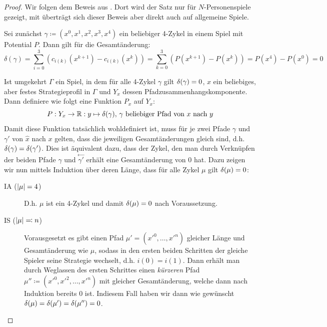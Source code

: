 \begin{proof}
	Wir folgen dem Beweis aus \cite[Anhang A]{MonShap}. Dort wird der Satz nur für $N$-Personenspiele gezeigt, mit  überträgt sich dieser Beweis aber direkt auch auf allgemeine Spiele.
	
	Sei zunächst $\gamma \coloneqq (x^0, x^1, x^2, x^3, x^4)$ ein beliebiger 4-Zykel in einem Spiel mit Potential $P$. Dann gilt für die Gesamtänderung:
		\[\delta(\gamma) = \sum_{i=0}^3 \left(c_{i(k)}(x^{k+1}) - c_{i(k)}(x^k)\right) = \sum_{k=0}^{3} \left(P(x^{k+1}) - P(x^k)\right) = P(x^4) - P(x^0) = 0^{}\]
		
	Ist umgekehrt $\Gamma$ ein Spiel, in dem für alle 4-Zykel $\gamma$ gilt $\delta(\gamma) = 0$, $x$ ein beliebiges, aber festes Strategieprofil in $\Gamma$ und $Y_x$ dessen Pfadzusammenhangskomponente. Dann definiere wie folgt eine Funktion $P_x$ auf $Y_x$:
		\[P: Y_x \to \mathbb{R}: y \mapsto \delta(\gamma), \,\gamma \text{ beliebiger Pfad von } x \text{ nach } y \]
	Damit diese Funktion tatsächlich wohldefiniert ist, muss für je zwei Pfade $\gamma$ und $\gamma'$ von $\hat{x}$ nach $x$ gelten, dass die jeweiligen Gesamtänderungen gleich sind, d.h. $\delta(\gamma) = \delta(\gamma')$. Dies ist äquivalent dazu, dass der Zykel, den man durch Verknüpfen der beiden Pfade $\gamma$ und $\overset{\leftarrow}{\gamma'}$ erhält eine Gesamtänderung von $0$ hat. Dazu zeigen wir nun mittels Induktion über deren Länge, dass für alle Zykel $\mu$ gilt $\delta(\mu) = 0$:
	\begin{description}
		\item[IA ($\left|\mu\right|=4$)] D.h. $\mu$ ist ein 4-Zykel und damit $\delta(\mu) = 0$ nach Voraussetzung.
		\item[IS ($\left|\mu\right|\eqqcolon n$)] Vorausgesetzt es gibt einen Pfad $\mu' = (x'^0, \dots, x'^n)$ gleicher Länge und Gesamtänderung wie $\mu$, sodass in den ersten beiden Schritten der gleiche Spieler seine Strategie wechselt, d.h. $i(0)=i(1)$. Dann erhält man durch Weglassen des ersten Schrittes einen \emph{kürzeren} Pfad $\mu'' \coloneqq (x'^0, x'^2, \dots, x'^n)$ mit gleicher Gesamtänderung, welche dann nach Induktion bereits $0$ ist. Indiesem Fall haben wir dann wie gewünscht $\delta(\mu) = \delta(\mu') = \delta(\mu'') = 0$.
		

\end{description}
\end{proof}
